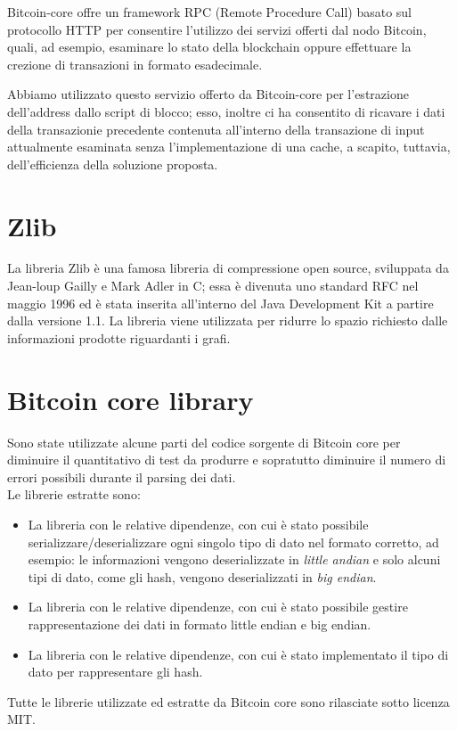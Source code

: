 Bitcoin-core offre un framework RPC (Remote Procedure Call) basato sul protocollo HTTP per consentire l'utilizzo dei servizi offerti dal nodo Bitcoin, quali, ad esempio,  esaminare lo stato della blockchain oppure effettuare la crezione di transazioni in formato esadecimale.

Abbiamo utilizzato questo servizio offerto da Bitcoin-core per l'estrazione dell'address dallo script di blocco; esso, inoltre ci ha consentito di ricavare i dati della transazionie precedente contenuta all'interno della transazione di input attualmente esaminata senza l'implementazione di una cache, a scapito, tuttavia, dell'efficienza della soluzione proposta.

\section{Zlib} \label{sec:zlib}

La libreria Zlib \cite{zlib:github} è una famosa libreria di compressione open source, sviluppata da Jean-loup Gailly e Mark Adler in C; essa è divenuta  uno standard RFC nel maggio 1996 ed è stata inserita all'interno del Java Development Kit a partire dalla versione 1.1.
La libreria viene utilizzata per ridurre lo spazio richiesto dalle informazioni prodotte riguardanti i grafi.

\section{Bitcoin core library} \label{sec:bitcoinCoreLib}

Sono state utilizzate alcune parti del codice sorgente di Bitcoin core per diminuire il quantitativo di test da produrre e sopratutto diminuire il numero di errori possibili durante il parsing dei dati.\\
Le librerie estratte sono:
\begin{itemize}
  \item La libreria  con le relative dipendenze, con cui è stato possibile serializzare/deserializzare ogni singolo tipo di dato nel formato corretto, ad esempio: le informazioni vengono deserializzate in \emph{little andian} e solo alcuni tipi di dato, come gli hash, vengono deserializzati in \emph{big endian}.
  \item La libreria  con le relative dipendenze, con cui è stato possibile gestire rappresentazione dei dati in formato little endian e big endian.
  \item La libreria  con le relative dipendenze, con cui è stato implementato il tipo di dato per rappresentare gli hash.
\end{itemize}
Tutte le librerie utilizzate ed estratte da Bitcoin core sono rilasciate sotto licenza MIT.
